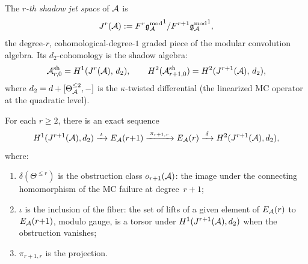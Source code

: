 \begin{definition}
The \emph{$r$-th shadow jet space} of $\mathcal{A}$ is
\begin{equation}%
J^r(\cA) :=
F^r {\gAmod}^1 / F^{r+1} {\gAmod}^1,
\end{equation}
the degree-$r$, cohomological-degree-$1$ graded piece of
the modular convolution algebra. Its
$d_2$-cohomology is the shadow algebra:
\begin{equation}%
\cA^{\mathrm{sh}}_{r,0} = H^1(J^r(\cA),\, d_2),
\qquad
H^2(\cA^{\mathrm{sh}}_{r+1,0})
= H^2(J^{r+1}(\cA),\, d_2),
\end{equation}
where $d_2 = d + [\Theta_{\mathcal{A}}^{\leq 2}, -]$ is the
$\kappa$-twisted differential (the linearized MC operator
at the quadratic level).
\end{definition}

\begin{proposition}
For each $r \geq 2$, there is an exact sequence
\begin{equation}%
H^1(J^{r+1}(\cA), d_2)
\xrightarrow{\;\iota\;}
E_\cA(r{+}1)
\xrightarrow{\;\pi_{r+1,r}\;}
E_\cA(r)
\xrightarrow{\;\delta\;}
H^2(J^{r+1}(\cA), d_2),
\end{equation}
where:
\begin{enumerate}[label=\textup{(\roman*)}]
\item $\delta(\Theta^{\leq r})$ is the obstruction class
 $o_{r+1}(\mathcal{A})$: the image under the connecting
 homomorphism of the MC failure at degree~$r{+}1$;
\item $\iota$ is the inclusion of the fiber: the set
 of lifts of a given element of $E_{\mathcal{A}}(r)$ to
 $E_{\mathcal{A}}(r{+}1)$, modulo gauge, is a torsor under
 $H^1(J^{r+1}(\mathcal{A}), d_2)$ when the obstruction vanishes;
\item $\pi_{r+1,r}$ is the projection.
\end{enumerate}
\end{proposition}

